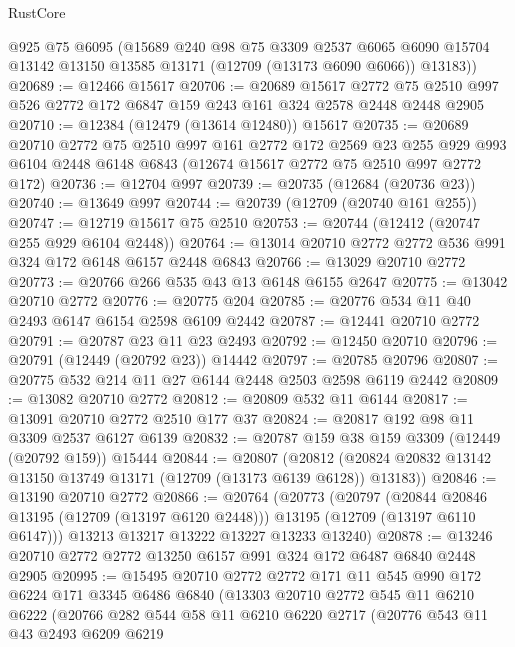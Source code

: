 \begin{lexlean}{RustCore}
\begin{coremodule}
      @925
      @75
      @6095
      (@15689
        @240
        @98
        @75
        @3309
        @2537
        @6065
        @6090
        @15704
        @13142
        @13150
        @13585
        @13171
        (@12709 (@13173 @6090 @6066))
        @13183))
@20689 := @12466 @15617
@20706 := @20689
    @15617
    @2772
    @75
    @2510
    @997
    @526
    @2772
    @172
    @6847
    @159
    @243
    @161
    @324
    @2578
    @2448
    @2448
    @2905
@20710 := @12384 (@12479 (@13614 @12480)) @15617
@20735 := @20689
    @20710
    @2772
    @75
    @2510
    @997
    @161
    @2772
    @172
    @2569
    @23
    @255
    @929
    @993
    @6104
    @2448
    @6148
    @6843
    (@12674 @15617 @2772 @75 @2510 @997 @2772 @172)
@20736 := @12704 @997
@20739 := @20735 (@12684 (@20736 @23))
@20740 := @13649 @997
@20744 := @20739 (@12709 (@20740 @161 @255))
@20747 := @12719 @15617 @75 @2510
@20753 := @20744 (@12412 (@20747 @255 @929 @6104 @2448))
@20764 := @13014 @20710 @2772 @2772 @536 @991 @324 @172 @6148 @6157 @2448 @6843
@20766 := @13029 @20710 @2772
@20773 := @20766 @266 @535 @43 @13 @6148 @6155 @2647
@20775 := @13042 @20710 @2772
@20776 := @20775 @204
@20785 := @20776 @534 @11 @40 @2493 @6147 @6154 @2598 @6109 @2442
@20787 := @12441 @20710 @2772
@20791 := @20787 @23 @11 @23 @2493
@20792 := @12450 @20710
@20796 := @20791 (@12449 (@20792 @23)) @14442
@20797 := @20785 @20796
@20807 := @20775 @532 @214 @11 @27 @6144 @2448 @2503 @2598 @6119 @2442
@20809 := @13082 @20710 @2772
@20812 := @20809 @532 @11 @6144
@20817 := @13091 @20710 @2772 @2510 @177 @37
@20824 := @20817 @192 @98 @11 @3309 @2537 @6127 @6139
@20832 := @20787 @159 @38 @159 @3309 (@12449 (@20792 @159)) @15444
@20844 := @20807
    (@20812 (@20824 @20832 @13142 @13150 @13749 @13171 (@12709 (@13173 @6139 @6128)) @13183))
@20846 := @13190 @20710 @2772
@20866 := @20764
    (@20773
      (@20797
        (@20844 @20846 @13195 (@12709 (@13197 @6120 @2448)))
        @13195
        (@12709 (@13197 @6110 @6147)))
      @13213
      @13217
      @13222
      @13227
      @13233
      @13240)
@20878 := @13246 @20710 @2772 @2772 @13250 @6157 @991 @324 @172 @6487 @6840 @2448 @2905
@20995 := @15495
    @20710
    @2772
    @2772
    @171
    @11
    @545
    @990
    @172
    @6224
    @171
    @3345
    @6486
    @6840
    (@13303
      @20710
      @2772
      @545
      @11
      @6210
      @6222
      (@20766
        @282
        @544
        @58
        @11
        @6210
        @6220
        @2717
        (@20776
          @543
          @11
          @43
          @2493
          @6209
          @6219

\end{coremodule}
\end{lexlean}
